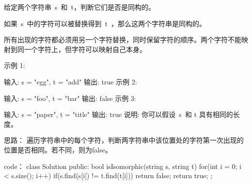 给定两个字符串 s 和 t，判断它们是否是同构的。

如果 s 中的字符可以被替换得到 t ，那么这两个字符串是同构的。

所有出现的字符都必须用另一个字符替换，同时保留字符的顺序。两个字符不能映射到同一个字符上，但字符可以映射自己本身。

示例 1:

输入: s = "egg", t = "add"
输出: true
示例 2:

输入: s = "foo", t = "bar"
输出: false
示例 3:

输入: s = "paper", t = "title"
输出: true
说明:
你可以假设 s 和 t 具有相同的长度。




















思路：
遍历字符串中的每个字符，判断两字符串中该位置处的字符第一次出现的位置是否相同。若不同，则为false。
























code：
class Solution {
public:
    bool isIsomorphic(string s, string t) {
        for(int i = 0; i < s.size(); i++)
        {
            if(s.find(s[i]) != t.find(t[i])) return false;
        }
        return true;
    }
};